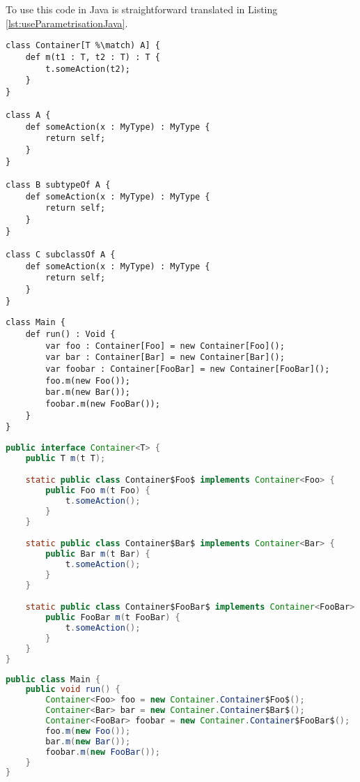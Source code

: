  To use this code in Java is straightforward translated in Listing
\ref{lst:useParametrisationJava}.

\begin{lstlisting}[float,language=ooplss,caption=Parametrisation in \ooplss,label=lst:parametrisationOoplss]
class Container[T %\match) A] {
	def m(t1 : T, t2 : T) : T {
		t.someAction(t2);
	}
}

class A {
	def someAction(x : MyType) : MyType {
		return self;
	}
}

class B subtypeOf A {
	def someAction(x : MyType) : MyType {
		return self;
	}
}

class C subclassOf A {
	def someAction(x : MyType) : MyType {
		return self;
	}
}
\end{lstlisting}

\begin{lstlisting}[float,language=ooplss,caption=Valid use of a match-bound container,label=lst:useParametrisationOoplss]
class Main {
	def run() : Void {
		var foo : Container[Foo] = new Container[Foo]();
		var bar : Container[Bar] = new Container[Bar]();
		var foobar : Container[FooBar] = new Container[FooBar]();
		foo.m(new Foo());
		bar.m(new Bar());
		foobar.m(new FooBar());
	}
}
\end{lstlisting}

\begin{lstlisting}[float,language=java,caption=Container class translated to Java,label=lst:parametrisationJava]
public interface Container<T> {
	public T m(t T);

	static public class Container$Foo$ implements Container<Foo> {
		public Foo m(t Foo) {
			t.someAction();
		}
	}

	static public class Container$Bar$ implements Container<Bar> {
		public Bar m(t Bar) {
			t.someAction();
		}
	}

	static public class Container$FooBar$ implements Container<FooBar> {
		public FooBar m(t FooBar) {
			t.someAction();
		}
	}
}
\end{lstlisting}

\begin{lstlisting}[float,language=java,caption=Use of parametised classes in Java,label=lst:useParametrisationJava]
public class Main {
	public void run() {
		Container<Foo> foo = new Container.Container$Foo$();
		Container<Bar> bar = new Container.Container$Bar$();
		Container<FooBar> foobar = new Container.Container$FooBar$();
		foo.m(new Foo());
		bar.m(new Bar());
		foobar.m(new FooBar());
	}
}
\end{lstlisting}

